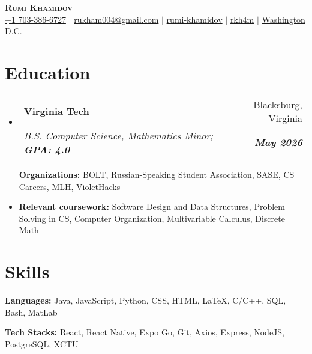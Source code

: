 \documentclass[letterpaper, 10pt]{article}
\makeatletter
\newcommand{\resumeItem}[1]{
  \item\small{
    {#1 \vspace{-2pt}}
  }
}
\newcommand{\resumeEducationHeading}[6]{
  \vspace{-2pt}\item
    \begin{tabular*}{0.97\textwidth}[t]{l@{\extracolsep{\fill}}r}
      \textbf{#1} & #2 \\
      \textit{\small#3} & \textit{\small #4} \\
    \end{tabular*}\vspace{-5pt}
}
\newcommand{\resumeSubHeadingListStart}{\begin{itemize}[leftmargin=0.15in, label={}]}
\newcommand{\resumeSubHeadingListEnd}{\end{itemize}}
\newcommand{\resumeItemListStart}{\begin{itemize}}
\newcommand{\resumeItemListEnd}{\end{itemize}\vspace{-5pt}}
\makeatother
\begin{document}

\begin{center}
    \textbf{\Huge \scshape Rumi Khamidov} \\ \vspace{3pt}
    \small
    \faMobile \hspace{.5pt} \href{tel:7033866727}{+1 703-386-6727}
    $|$
    \faAt \hspace{.5pt} \href{mailto:rukham004@gmail.com}{rukham004@gmail.com}
    $|$
    \faLinkedinSquare \hspace{.5pt} \href{https://www.linkedin.com/in/rumi-khamidov-22b622290/}{rumi-khamidov}
    $|$
    \faGithub \hspace{.5pt} \href{https://github.com/rkh4m}{rkh4m}
    $|$
    \faMapMarker \hspace{.5pt} \href{https://maps.app.goo.gl/aoi52DAKhQkgQ1MT8}{Washington D.C.}
\end{center}



\section{Education}
  \vspace{3pt}
  \resumeSubHeadingListStart
    
    \resumeEducationHeading
      {Virginia Tech
      }{Blacksburg, Virginia}
      {B.S. Computer Science, Mathematics Minor; \textbf{GPA: 4.0}}{\textbf{May 2026}}

        \resumeItemListStart
	   \resumeItem{\textbf{Organizations:} BOLT, Russian-Speaking Student Association, SASE, CS Careers, MLH, VioletHacks}
             \resumeItem{\textbf{Relevant coursework:} Software Design and Data Structures, Problem Solving in CS, Computer Organization, Multivariable Calculus, Discrete Math}
         \resumeItemListEnd


\section{Skills}
  \vspace{2pt}
  \resumeSubHeadingListStart
    \small{\item{
        \textbf{Languages:}{ Java, JavaScript, Python, CSS, HTML, LaTeX, C/C++, SQL, Bash, MatLab } \\ \vspace{3pt}
                
        \textbf{Tech Stacks:}{ React, React Native, Expo Go, Git, Axios, Express, NodeJS, PostgreSQL, XCTU } \\ \vspace{3pt}
    }}
  \resumeSubHeadingListEnd
\end{document}
